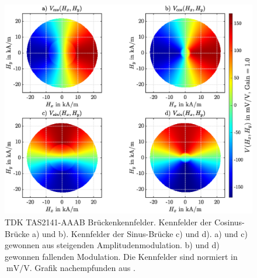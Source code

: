 \clearpage


\begin{figure}[tph]
	\centering
	\includegraphics[width=.93\linewidth]{appendix/images/3-TDK/TDK_Kennfelder}
	\caption[TDK TAS2141-AAAB Brückenkennfelder]{TDK TAS2141-AAAB Brückenkennfelder. Kennfelder der Cosinus-Brücke a) 
		und b). Kennfelder der Sinus-Brücke c) und d). a) und c) gewonnen aus steigenden Amplitudenmodulation. b) und 
		d) gewonnen fallenden Modulation. Die Kennfelder sind normiert in $\SI{}{\milli\volt\per\volt}$. Grafik 
		nachempfunden 
		aus \cite{Schuethe2019}.}
	\label{fig:tdkkennfelder}
\end{figure}


\clearpage



